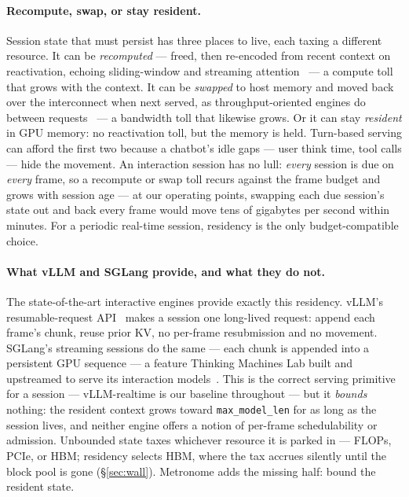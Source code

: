 \paragraph{Recompute, swap, or stay resident.} Session state that must persist has three places to
live, each taxing a different resource. It can be \emph{recomputed} --- freed, then re-encoded from
recent context on reactivation, echoing sliding-window and streaming
attention~\citep{longformer,mistral,streamingllm} --- a compute toll that grows with the context. It
can be \emph{swapped} to host memory and moved back over the interconnect when next served, as
throughput-oriented engines do between requests~\citep{vllm,flexgen} --- a bandwidth toll that likewise
grows. Or it can stay \emph{resident} in GPU memory: no reactivation toll, but the memory is held.
Turn-based serving can afford the first two because a chatbot's idle gaps --- user think time, tool
calls --- hide the movement. An interaction session has no lull: \emph{every} session is due on
\emph{every} frame, so a recompute or swap toll recurs against the frame budget and grows with session
age --- at our operating points, swapping each due session's state out and back every frame would move
tens of gigabytes per second within minutes. For a periodic real-time session, residency is the only
budget-compatible choice.

\paragraph{What vLLM and SGLang provide, and what they do not.} The state-of-the-art interactive
engines provide exactly this residency. vLLM's resumable-request API~\citep{vllmrealtime} makes a
session one long-lived request: append each frame's chunk, reuse prior KV, no per-frame resubmission
and no movement. SGLang's streaming sessions do the same --- each chunk is appended into a persistent
GPU sequence --- a feature Thinking Machines Lab built and upstreamed to serve its interaction
models~\citep{sglang,tmlinteraction}. This is the correct serving primitive for a session ---
vLLM-realtime is our baseline throughout --- but it \emph{bounds} nothing: the resident context grows
toward \texttt{max\_model\_len} for as long as the session lives, and neither engine offers a notion of
per-frame schedulability or admission. Unbounded state taxes whichever resource it is parked in ---
FLOPs, PCIe, or HBM; residency selects HBM, where the tax accrues silently until the block pool is gone
(\S\ref{sec:wall}). Metronome adds the missing half: bound the resident state.

